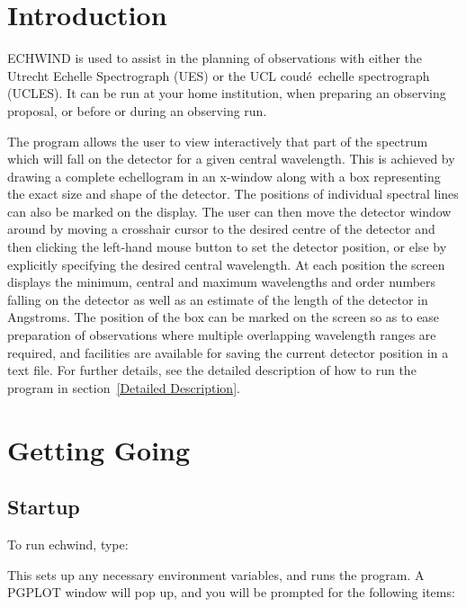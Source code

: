 \documentclass[11pt,nolof,noabs]{starlink}
\providecommand{\coude}{coud\'{e}}
\begin{document}
\scfrontmatter


\section{Introduction}

ECHWIND is used to assist in the planning of observations with either the
Utrecht Echelle Spectrograph (UES) or the UCL \coude\ echelle spectrograph
(UCLES). It can be run at your home institution, when preparing an observing
proposal, or before or during an observing run.

The program allows the user to view interactively that part of the spectrum
which will fall on the detector for a given central wavelength. This is
achieved by drawing a complete echellogram in an x-window along with a box
representing the exact size and shape of the detector. The positions of
individual spectral lines can also be marked on the display. The user can
then move the detector window around by moving a crosshair cursor to the
desired centre of the detector and then clicking the left-hand mouse button
to set the detector position, or else by explicitly specifying the desired
central wavelength. At each position the screen displays the minimum,
central and maximum wavelengths and order numbers falling on the detector
as well as an estimate of the length of the detector in Angstroms.  The
position of the box can be marked on the screen so as to ease preparation
of observations where multiple overlapping wavelength ranges are required,
and facilities are available for saving the current detector position in a
text file. For further details, see the detailed description of how to run
the program in section~\ref{Detailed Description}.

\section{Getting Going}
\subsection{Startup}

To run echwind, type:

\begin{terminalv}
\end{terminalv}

This sets up any necessary environment variables, and runs the program. A
PGPLOT window will pop up, and you will be prompted for the following
items:
\end{document}
